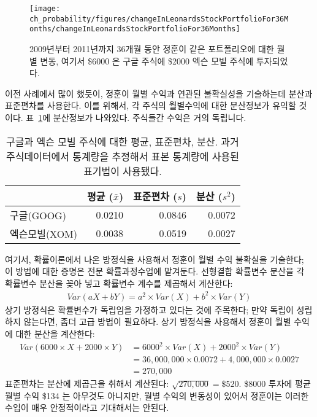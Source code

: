 \begin{figure}[ht]
\centering
\texttt{[image: ch\_probability/figures/changeInLeonardsStockPortfolioFor36Months/changeInLeonardsStockPortfolioFor36Months]}
\caption{2009년부터 2011년까지 36개월 동안 정훈이 같은 포트폴리오에 대한 월별 변동, 여기서 \$6000 은 구글 주식에 \$2000 엑슨 모빌 주식에 투자되었다.}
\label{changeInLeonardsStockPortfolioFor36Months}
\end{figure}

이전 사례에서 많이 했듯이, 정훈이 월별 수익과 연관된 불확실성을 기술하는데 분산과 표준편차를 사용한다. 이를 위해서, 각 주식의 월별수익에 대한 분산정보가 유익할 것이다. 표~\ref{sumStatOfGOOGXOM}에 분산정보가 나와있다. 주식들간 수익은 거의 독립니다.

\begin{table}
\centering
\begin{tabular}{lrrr}
\hline
	& 평균 ($\bar{x}$) & 표준편차 ($s$) & 분산 ($s^2$) \\
\hline
구글(GOOG) & 0.0210	& 0.0846					&	0.0072	\\
엑슨모빌(XOM) & 0.0038		& 0.0519					&	0.0027	\\
\hline
\end{tabular}
\caption{구글과 엑슨 모빌 주식에 대한 평균, 표준편차, 분산. 과거 주식데이터에서 통계량을 추정해서 표본 통계량에 사용된 표기법이 사용됐다.}
\label{sumStatOfGOOGXOM}
\end{table}

여기서, 확률이론에서 나온 방정식을 사용해서 정훈이 월별 수익 불확실을 기술한다; 이 방법에 대한 증명은 전문 확률과정수업에 맡겨둔다. 선형결합 확률변수 분산을 각 확률변수 분산을 꽂아 넣고 확률변수 계수를 제곱해서 계산한다:
\begin{align*}
Var(aX + bY) = a^2\times Var(X) + b^2\times Var(Y)
\end{align*}
상기 방정식은 확률변수가 독립임을 가정하고 있다는 것에 주목한다; 만약 독립이 성립하지 않는다면, 좀더 고급 방법이 필요하다. 상기 방정식을 사용해서 정훈이 월별 수익에 대한 분산을 계산한다:
\begin{align*}
Var(6000\times X + 2000\times Y)
	&= 6000^2\times Var(X) + 2000^2\times Var(Y) \\
	&= 36,000,000\times 0.0072 + 4,000,000\times 0.0027 \\
	&= 270,000
\end{align*}
표준편차는 분산에 제곱근을 취해서 계산된다: $\sqrt{270,000} = \$520$.
\$8000 투자에 평균 월별 수익 \$134 는 아무것도 아니지만, 월별 수익의 변동성이 있어서 정훈이는 이러한 수입이 매우 안정적이라고 기대해서는 안된다.

